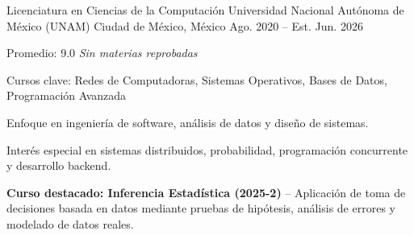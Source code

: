 \begin{cventries}

  \cventry
    {Licenciatura en Ciencias de la Computación}
    {Universidad Nacional Autónoma de México (UNAM)}
    {Ciudad de México, México}
    {Ago. 2020 -- Est. Jun. 2026}
    {
      \begin{cvitems}
        \item {Promedio: 9.0 \hfill \textit{Sin materias reprobadas}}
        \item {Cursos clave: Redes de Computadoras, Sistemas Operativos, Bases de Datos, Programación Avanzada}
        \item {Enfoque en ingeniería de software, análisis de datos y diseño de sistemas.}
        \item {Interés especial en sistemas distribuidos, probabilidad, programación concurrente y desarrollo backend.}
        \item {\textbf{Curso destacado: Inferencia Estadística (2025-2)} – Aplicación de toma de decisiones basada en datos mediante pruebas de hipótesis, análisis de errores y modelado de datos reales.}
      \end{cvitems}
    }

\end{cventries}
